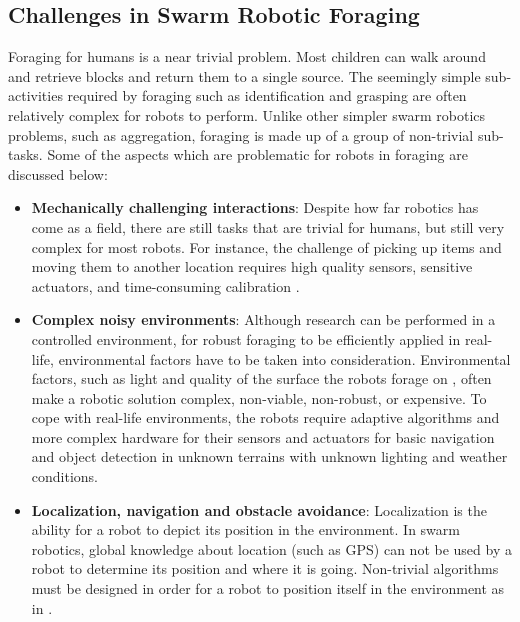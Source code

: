 \subsection{Challenges in Swarm Robotic Foraging}
\label{challengesinforaging}

Foraging for humans is a near trivial problem. Most children can walk around and retrieve blocks and return them to a single source. The seemingly simple sub-activities required by foraging such as identification and grasping are often relatively complex for robots to perform. Unlike other simpler swarm robotics problems, such as aggregation, foraging is made up of a group of non-trivial sub-tasks. Some of the aspects which are problematic for robots in foraging are discussed below:

\begin{itemize}
\item \textbf{Mechanically challenging interactions}: Despite how far robotics has come as a field, there are still tasks that are trivial for humans, but still very complex for most robots. For instance, the challenge of picking up items \cite{saxena2008robotic} and moving them to another location requires high quality sensors, sensitive actuators, and time-consuming calibration \cite{mondada2005cooperation}. 

\item \textbf{Complex noisy environments}: Although research can be performed in a controlled environment, for robust foraging to be efficiently applied in real-life, environmental factors have to be taken into consideration. Environmental factors, such as light \cite{browning2005real,jungel2003real} and quality of the surface the robots forage on \cite{trianni2006cooperative}, often make a robotic solution complex, non-viable, non-robust, or expensive. To cope with real-life environments, the robots require adaptive algorithms and more complex hardware for their sensors and actuators for basic navigation and object detection in unknown terrains with unknown lighting and weather conditions. 

\item \textbf{Localization, navigation and obstacle avoidance}: Localization is the ability for a robot to depict its position in the environment. In swarm robotics, global knowledge about location (such as GPS) can not be used by a robot to determine its position and where it is going. Non-trivial algorithms must be designed in order for a robot to position itself in the environment as in \cite{zhou2012motion,rothermich2004distributed,arkin1992cooperation}. 

\end{itemize}

